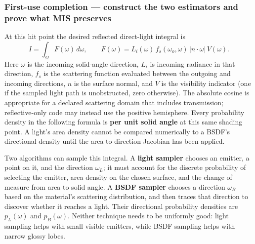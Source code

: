 \subsubsection{First-use completion --- construct the two estimators and prove what MIS preserves}\label{03-visual-computing-i-ch007-first-use-completion-construct-the-two-estimators-and-prove-what-mis-preserves}

At this hit point the desired reflected direct-light integral is \[
I=\int_{\Omega}F(\omega)\,d\omega,\qquad
F(\omega)=L_i(\omega)\,f_s(\omega_o,\omega)\,
  |n\cdot\omega|\,V(\omega).
\] Here \(\omega\) is the incoming solid-angle direction, \(L_i\) is incoming radiance in that direction, \(f_s\) is the scattering function evaluated between the outgoing and incoming directions, \(n\) is the surface normal, and \(V\) is the visibility indicator (one if the sampled light path is unobstructed, zero otherwise). The absolute cosine is appropriate for a declared scattering domain that includes transmission; reflective-only code may instead use the positive hemisphere. Every probability density in the following formula is \textbf{per unit solid angle} at this same shading point. A light's area density cannot be compared numerically to a BSDF's directional density until the area-to-direction Jacobian has been applied.

Two algorithms can sample this integral. A \textbf{light sampler} chooses an emitter, a point on it, and the direction \(\omega_L\); it must account for the discrete probability of selecting the emitter, area density on the chosen surface, and the change of measure from area to solid angle. A \textbf{BSDF sampler} chooses a direction \(\omega_B\) based on the material's scattering distribution, and then traces that direction to discover whether it reaches a light. Their directional probability densities are \(p_L(\omega)\) and \(p_B(\omega)\). Neither technique needs to be uniformly good: light sampling helps with small visible emitters, while BSDF sampling helps with narrow glossy lobes.

